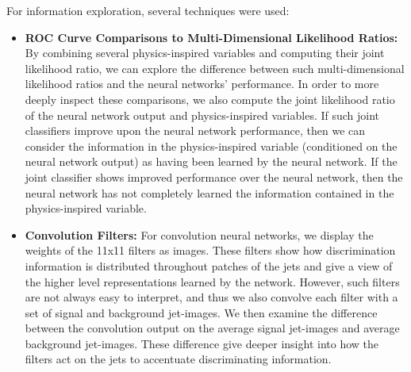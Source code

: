 %

For information exploration, several techniques were used:
\begin{itemize}

\item \textbf{ROC Curve Comparisons to Multi-Dimensional Likelihood Ratios:}  By combining several physics-inspired variables and computing their joint likelihood ratio, we can explore the difference between such multi-dimensional likelihood ratios and the neural networks' performance.  In order to more deeply inspect these comparisons, we also compute the joint likelihood ratio of the neural network output and physics-inspired variables.  If such joint classifiers improve upon the neural network performance, then we can consider the information in the physics-inspired variable (conditioned on the neural network output) as having been learned by the neural network.  If the joint classifier shows improved performance over the neural network, then the neural network has not completely learned the information contained in the physics-inspired variable.

\item \textbf{Convolution Filters:}  For convolution neural networks, we display the weights of the 11x11 filters as images.  These filters show how discrimination information is distributed throughout patches of the jets and give a view of the higher level representations learned by the network.  However, such filters are not always easy to interpret, and thus we also convolve each filter with a set of signal and background jet-images.  We then examine the difference between the  convolution output on the average signal jet-images and average background jet-images.  These difference give deeper insight into how the filters act on the jets to accentuate discriminating information.


\end{itemize}
